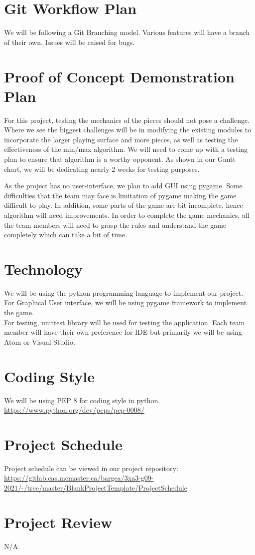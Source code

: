 \documentclass{article}
\begin{document}
\section{Git Workflow Plan}
We will be following a Git Branching model. Various features will have a branch of their own. Issues will be raised for bugs.

\section{Proof of Concept Demonstration Plan}
For this project, testing the mechanics of the pieces should not pose a challenge. Where we see the biggest challenges will be in modifying the existing modules to incorporate the larger playing surface and more pieces, as well as testing the effectiveness of the min/max algorithm. We will need to come up with a testing plan to ensure that algorithm is a worthy opponent. As shown in our Gantt chart, we will be dedicating nearly 2 weeks for testing purposes.

As the project has no user-interface, we plan to add GUI using pygame. Some difficulties that the team may face is limitation of pygame making the game difficult to play.
In addition, some parts of the game are bit incomplete, hence algorithm will need improvements. In order to complete the game mechanics, all the team members will need to grasp the rules and understand the game completely which can take a bit of time.

\section{Technology}
We will be using the python programming language to implement our project. \\
For Graphical User interface, we will be using pygame framework to implement the game. \\
For testing, unittest library will be used for testing the application.
Each team member will have their own preference for IDE but primarily we will be using Atom or Visual Studio.

\section{Coding Style}
We will be using PEP 8 for coding style in python. \\ \url{https://www.python.org/dev/peps/pep-0008/}

\section{Project Schedule}

Project schedule can be viewed in our project repository:\\
\url{https://gitlab.cas.mcmaster.ca/bargea/3xa3-g09-2021/-/tree/master/BlankProjectTemplate/ProjectSchedule}

\section{Project Review}
N/A
\end{document}
